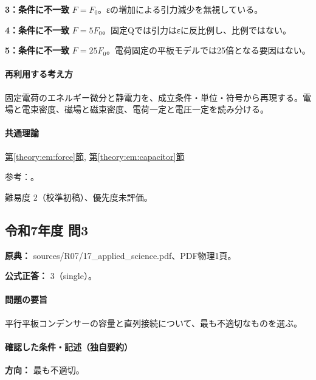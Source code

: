 \noindent\textbf{3：条件に不一致} \(F=F_0\)。εの増加による引力減少を無視している。\par

\noindent\textbf{4：条件に不一致} \(F=5F_0\)。固定Qでは引力はεに反比例し、比例ではない。\par

\noindent\textbf{5：条件に不一致} \(F=25F_0\)。電荷固定の平板モデルでは25倍となる要因はない。\par

\paragraph{再利用する考え方} 固定電荷のエネルギー微分と静電力を、成立条件・単位・符号から再現する。電場と電束密度、磁場と磁束密度、電荷一定と電圧一定を読み分ける。

\paragraph{共通理論} \hyperref[theory:em:force]{第\ref*{theory:em:force}節}, \hyperref[theory:em:capacitor]{第\ref*{theory:em:capacitor}節}

\par 参考：\cite{mit_em05}。

\par 難易度 2（校準初稿）、優先度未評価。

\subsection{令和7年度 問3}
\label{q:r07-reg-applied-03}

\noindent\textbf{原典：} sources/R07/17\_applied\_science.pdf、PDF物理1頁。

\textbf{公式正答：} 3（single）。

\paragraph{問題の要旨} 平行平板コンデンサーの容量と直列接続について、最も不適切なものを選ぶ。

\paragraph{確認した条件・記述（独自要約）}\mbox{}\par

\noindent\textbf{方向：} 最も不適切。\par

